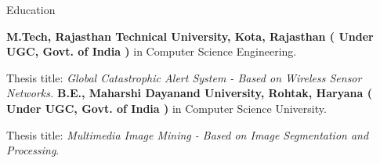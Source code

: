 \begin{rubric}{Education}

\entry*[2009 -- 2011]%
	\textbf{M.Tech, Rajasthan Technical University, Kota, Rajasthan ( Under UGC, Govt. of India )} in Computer Science Engineering.
	\par Thesis title: \emph{Global Catastrophic Alert System - Based on Wireless Sensor Networks.}
%
\entry*[2005 -- 2009]%
	\textbf{B.E., Maharshi Dayanand University, Rohtak, Haryana ( Under UGC, Govt. of India )} in Computer Science University.\par
	Thesis title: \emph{Multimedia Image Mining - Based on Image Segmentation and Processing}.
\end{rubric}